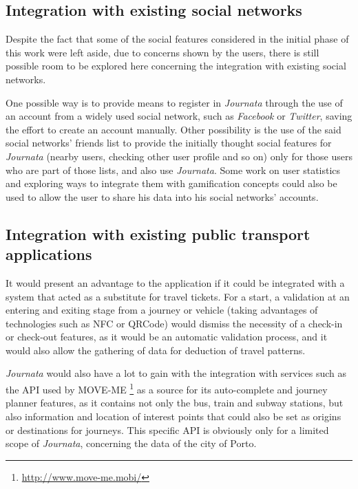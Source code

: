 \subsection{Integration with existing social networks}

Despite the fact that some of the social features considered in the initial phase of this work were left aside, due to concerns shown by the users, there is still possible room to be explored here concerning the integration with existing social networks. 

One possible way is to provide means to register in \emph{Journata} through the use of an account from a widely used social network, such as \emph{Facebook} or \emph{Twitter}, saving the effort to create an account manually.
Other possibility is the use of the said social networks' friends list to provide the initially thought social features for \emph{Journata} (nearby users, checking other user profile and so on) only for those users who are part of those lists, and also use \emph{Journata}.
Some work on user statistics and exploring ways to integrate them with gamification concepts could also be used to allow the user to share his data into his social networks' accounts.


\subsection{Integration with existing public transport applications}

It would present an advantage to the application if it could be integrated with a system that acted as a substitute for travel tickets. For a start, a validation at an entering and exiting stage from a journey or vehicle (taking advantages of technologies such as NFC or QRCode) would dismiss the necessity of a check-in or check-out features, as it would be an automatic validation process, and it would also allow the gathering of data for deduction of travel patterns.

\emph{Journata} would also have a lot to gain with the integration with services such as the API used by MOVE-ME \footnote{\url{http://www.move-me.mobi/}} as a source for its auto-complete and journey planner features, as it contains not only the bus, train and subway stations, but also information and location of interest points that could also be set as origins or destinations for journeys. This specific API is obviously only for a limited scope of \emph{Journata}, concerning the data of the city of Porto. 




